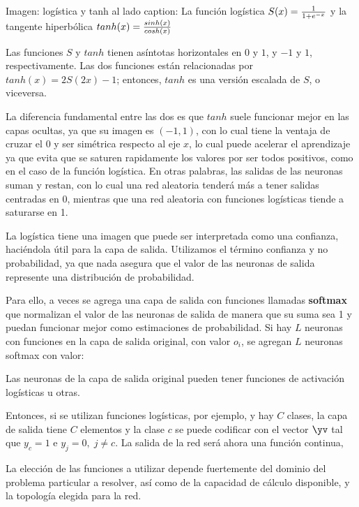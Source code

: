 
Imagen: logística  y tanh al lado
caption: La función logística $S(x) = \frac{1}{1+ e^{-x}}$ y la tangente hiperbólica $tanh(x)= \frac{sinh(x)}{cosh(x)} $ 

Las funciones $S$ y $tanh$ tienen asíntotas horizontales en $0$ y $1$, y $-1$ y $1$, respectivamente. Las dos funciones están relacionadas por $ tanh(x)= 2 S(2x) -1$; entonces, $tanh$ es una versión escalada de $S$, o viceversa. 

La diferencia fundamental entre las dos es que $tanh$ suele funcionar mejor en las capas ocultas, ya que su imagen es $(-1,1)$, con lo cual tiene la ventaja de cruzar el $0$ y ser simétrica respecto al eje $x$, lo cual puede acelerar el aprendizaje ya que evita que se saturen rapidamente los valores por ser todos positivos, como en el caso de la función logística. En otras palabras, las salidas de las neuronas suman y restan, con lo cual una red aleatoria tenderá más a tener salidas centradas en 0, mientras que una red aleatoria con funciones logísticas tiende a saturarse en 1.

La logística tiene una imagen que puede ser interpretada como una confianza, haciéndola útil para la capa de salida. Utilizamos el término confianza y no probabilidad, ya que nada asegura que el valor de las neuronas de salida represente una distribución de probabilidad.

Para ello, a veces se agrega una capa de salida con funciones llamadas \textbf{softmax} que normalizan el valor de las neuronas de salida de manera que su suma sea 1 y puedan funcionar mejor como estimaciones de probabilidad. Si hay $L$ neuronas con funciones en la capa de salida original, con valor $o_i$, se agregan $L$ neuronas softmax con valor:



Las neuronas de la capa de salida original pueden tener funciones de activación logísticas u otras.

Entonces, si se utilizan funciones logísticas, por ejemplo, y hay $C$ clases, la capa de salida tiene $C$ elementos y la clase $c$ se puede codificar con el vector $\yv$ tal que $y_c=1$ e $y_j=0, \; j \neq c$. La salida de la red será ahora una función continua, 

La elección de las funciones a utilizar depende fuertemente del dominio del problema particular a resolver, así como de la capacidad de cálculo disponible, y la topología elegida para la red.


